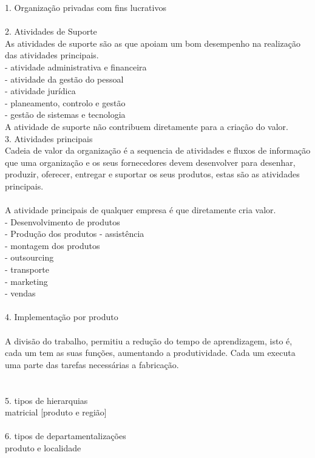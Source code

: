 1. Organização privadas com fins lucrativos\\
\\
2. Atividades de Suporte\\
As atividades de suporte são as que apoiam um bom desempenho na realização das atividades principais.\\
- atividade administrativa e financeira\\
- atividade da gestão do pessoal\\
- atividade jurídica\\
- planeamento, controlo e gestão\\
- gestão de sistemas e tecnologia\\
A atividade de suporte não contribuem diretamente para a criação do valor.\\
3. Atividades principais\\
Cadeia de valor da organização é a sequencia de atividades e fluxos de informação que uma organização e os seus fornecedores devem desenvolver para desenhar, produzir, oferecer, entregar e suportar os seus produtos, estas são as atividades principais.\\
\\
A atividade principais de qualquer empresa é que diretamente cria valor.\\
- Desenvolvimento de produtos\\
- Produção dos produtos
- assistência\\
- montagem dos produtos\\
- outsourcing\\
- transporte\\
- marketing\\
- vendas\\
\\
4. Implementação por produto\\
\\
A divisão do trabalho, permitiu a redução do tempo de aprendizagem, isto é, cada um tem as suas funções, aumentando a produtividade. Cada um executa uma parte das tarefas necessárias a fabricação.\\
\\
\\
5. tipos de hierarquias\\
matricial [produto e região]\\
\\
6. tipos de departamentalizações\\
produto e localidade\\


